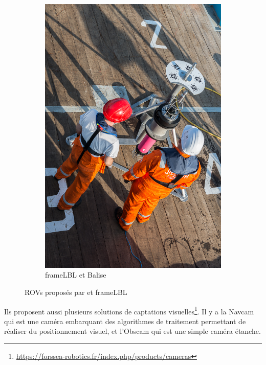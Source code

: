 \begin{figure}[!htb]
\begin{subfigure}[b]{0.3\textwidth}
					\caption{\atoll{}}
				\end{subfigure}
				\hfill
				\begin{subfigure}[b]{0.3\textwidth}
					\centering
					\includegraphics[width=\textwidth]{imgs/Frame.jpg}
					\caption{\gls{frameLBL} et Balise}
				\end{subfigure}
				\caption{\gls{ROV}s proposés par \forssea{} et \gls{frameLBL}}
				\label{fig:ROVs}
			\end{figure}

			Ils proposent aussi plusieurs solutions de captations visuelles\footnote{\url{https://forssea-robotics.fr/index.php/products/cameras}}. Il y a la \gls{Navcam} qui est une caméra embarquant des algorithmes de traitement permettant de réaliser du positionnement visuel, et l'\gls{Obscam} qui est une simple caméra étanche.

